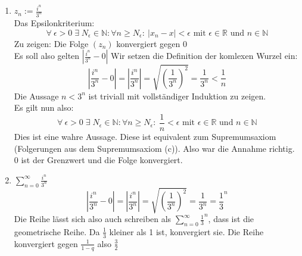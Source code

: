 \documentclass{article}
\begin{document}
\begin{enumerate}[ label = (\alph*) ]
\begin{enumerate}[ label = (\roman*) ]
            \item \(z_n := \frac{i^n}{3^n}\) \\
            Das Epsilonkriterium:
            \[\forall \: \epsilon > 0 \; \exists \; N_{\epsilon} \in \mathbb{N} : \forall n \geq N_{\epsilon}: \: |x_n - x| < \epsilon
                \text{ mit } \epsilon \in \mathbb{R} \text{ und } n \in \mathbb{N}\]
            Zu zeigen: Die Folge \((z_n)\) konvergiert gegen 0 \\
            Es soll also gelten \(|\frac{i^n}{3^n} -0|\)
            Wir setzen die Definition der komlexen Wurzel ein:
            \[ |\frac{i^n}{3^n} -0| = |\frac{i^n}{3^n}| = \sqrt{ {\left( \frac{1}{3^n} \right)}^2 } = \frac{1}{3^n} < \frac{1}{n}\]
            Die Aussage \(n < 3^n\) ist triviall mit vollständiger Induktion zu zeigen. \\
            Es gilt nun also: \\
            \[\forall \: \epsilon > 0 \; \exists \; N_{\epsilon} \in \mathbb{N} : \forall n \geq N_{\epsilon}: \: \frac{1}{n} < \epsilon
                \text{ mit } \epsilon \in \mathbb{R} \text{ und } n \in \mathbb{N}\]
            Dies ist eine wahre Aussage. Diese ist equivalent zum Supremumsaxiom (Folgerungen aus dem Supremumsaxiom (c)).
            Also war die Annahme richtig. 0 ist der Grenzwert und die Folge konvergiert.

            \item \( \sum_{n=0}^{\infty} \frac{i^n}{3^n} \) \\
            \[ |\frac{i^n}{3^n} -0| = |\frac{i^n}{3^n}| = \sqrt{ {\left( \frac{1}{3^n} \right)}^2 } = \frac{1}{3^n} = {\frac{1}{3}}^n\]
            Die Reihe lässt sich also auch schreiben als \(\sum_{n=0}^{\infty} {\frac{1}{3}}^n \), dass ist die geometrische Reihe.
            Da \(\frac{1}{3}\) kleiner als 1 ist, konvergiert sie. Die Reihe konvergiert gegen \(\frac{1}{1-q}\) also \(\frac{3}{2}\)
            

\end{enumerate}
\end{enumerate}
\end{document}
